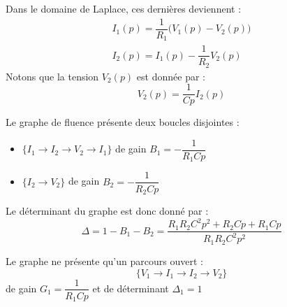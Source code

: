 Dans le domaine de Laplace, ces dernières deviennent :
\begin{align*}
    I_1(p)=\dfrac{1}{R_1}\big(V_1(p)-V_2(p)\big)\\
    I_2(p)=I_1(p)-\dfrac{1}{R_2}V_2(p)
\end{align*}
Notons que la tension $V_2(p)$ est donnée par :
\[
    V_2(p)=\dfrac{1}{Cp}I_2(p)
\]
\begin{center}
    
\end{center}
Le graphe de fluence présente deux boucles disjointes :
\begin{itemize}
    \item $\{I_1\rightarrow I_2\rightarrow V_2\rightarrow I_1\}$ 
          de gain $B_1=-\dfrac{1}{R_1Cp}$ 
    \item $\{I_2\rightarrow V_2\}$ de gain $B_2=-\dfrac{1}{R_2Cp}$ 
\end{itemize}
Le déterminant du graphe est donc donné par :
\[
    \Delta=1-B_1-B_2=\dfrac{R_1R_2C^2p^2+R_2Cp+R_1Cp}{R_1R_2C^2p^2}
\]

Le graphe ne présente qu'un parcours ouvert :
\[
    \{V_1\rightarrow I_1\rightarrow I_2\rightarrow V_2\}
\]
de gain $G_1=\dfrac{1}{R_1Cp}$ et de déterminant $\Delta_1=1$

